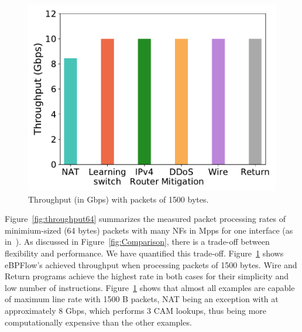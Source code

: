 \begin{figure}[th]
\centering
\includegraphics[width=.85\linewidth]{figures/throughput_gbps_1500B.pdf}
\caption{Throughput (in Gbps) with packets of 1500 bytes.}
\label{fig:throughput1500}
\end{figure}

Figure~\ref{fig:throughput64} summarizes the measured packet processing rates of minimium-sized (64 bytes) packets with many NFs in Mpps for one interface (as in~\cite{FlowBlaze2019}). As discussed in Figure~\ref{fig:Comparison}, there is a trade-off between flexibility and performance.
We have quantified this trade-off. Figure~\ref{fig:throughput1500} shows eBPFlow's achieved throughput when processing packets of 1500 bytes. Wire and Return programs achieve the highest rate in both cases for their simplicity and low number of instructions. Figure~\ref{fig:throughput1500} shows that almost all examples are capable of maximum line rate with 1500 B packets, NAT being an exception with at approximately 8 Gbps, which performs 3 CAM lookups, thus being more computationally expensive than the other examples.


